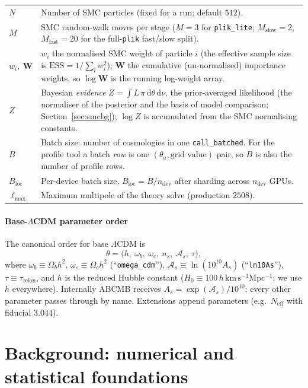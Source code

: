 \documentclass[11pt]{article}
\newcommand{\code}[1]{\texttt{\small #1}}
\newcommand{\Neff}{N_{\mathrm{eff}}}
\newcommand{\Lmax}{\ell_{\max}}
\newcommand{\Bloc}{B_{\mathrm{loc}}}
\begin{document}
\begin{longtable}{p{}p{}}
$N$ & Number of SMC particles (fixed for a run; default $512$). \\
$M$ & SMC random-walk moves per stage ($M=3$ for \code{plik\_lite};
$M_{\mathrm{slow}}=2$, $M_{\mathrm{fast}}=20$ for the full-\code{plik}
fast/slow split). \\
$w_i,\ \bm{W}$ & $w_i$ the normalised SMC weight of particle $i$ (the
effective sample size is $\mathrm{ESS}=1/\sum_i w_i^2$); $\bm W$ the
cumulative (un-normalised) importance weights, so $\log\bm W$ is the
running log-weight array. \\
$Z$ & Bayesian \emph{evidence} $Z=\int L\,\pi\,\mathrm d\theta\,\mathrm d\nu$,
the prior-averaged likelihood (the normaliser of the posterior and the
basis of model comparison; Section~\ref{sec:smcbg}); $\log Z$ is accumulated
from the SMC normalising constants. \\
$B$ & Batch size: number of cosmologies in one
\code{call\_batched}. For the profile tool a batch \emph{row} is one
$(\theta_a,\text{grid value})$ pair, so $B$ is also the number of profile
rows. \\
$\Bloc$ & Per-device batch size, $\Bloc=B/n_{\mathrm{dev}}$ after
sharding across $n_{\mathrm{dev}}$ GPUs. \\
$\Lmax$ & Maximum multipole of the theory solve (production $2508$). \\
\bottomrule
\end{longtable}

\paragraph{Base-$\Lambda$CDM parameter order}
The canonical order for base $\Lambda$CDM is
\[
\theta=\bigl(h,\ \omega_b,\ \omega_c,\ n_s,\ \mathcal{A}_s,\ \tau\bigr),
\]
where $\omega_b\equiv\Omega_b h^2$, $\omega_c\equiv\Omega_c h^2$
(``\code{omega\_cdm}''), $\mathcal{A}_s\equiv\ln(10^{10}A_s)$
(``\code{ln10As}''), $\tau\equiv\tau_{\mathrm{reion}}$, and $h$ is the
reduced Hubble constant ($H_0\equiv100\,h\,\mathrm{km\,s^{-1}Mpc^{-1}}$;
we use $h$ everywhere). Internally \textsc{ABCMB} receives
$A_s=\exp(\mathcal{A}_s)/10^{10}$; every other parameter passes through by
name. Extensions append parameters (e.g.\ $\Neff$ with fiducial $3.044$).

\section{Background: numerical and statistical foundations}
\label{sec:background}
\end{document}
